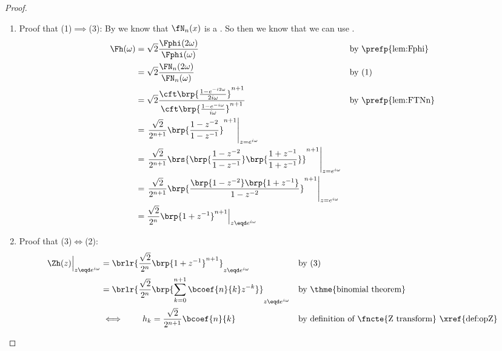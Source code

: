 \begin{proof}
\begin{enumerate}
  \item Proof that (1)$\implies$(3):
        By  we know that $\fN_n(x)$ is a  .
        So then we know that we can use .
        \begin{align*}
          \Fh(\omega)
            &= \sqrt{2}\frac{\Fphi(2\omega)}{\Fphi(\omega)}
            && \text{by \prefp{lem:Fphi}}
          \\&= \sqrt{2}\frac{\FN_n(2\omega)}{\FN_n(\omega)}
            && \text{by (1)}
          \\&= \sqrt{2}\frac{{\cft}\brp{\frac{1-e^{-i2\omega}}{2i\omega}}^{n+1}}
                            {{\cft}\brp{\frac{1-e^{-i\omega}}{i\omega}}^{n+1}}
            && \text{by \prefp{lem:FTNn}}
          \\&= \left.\frac{\sqrt{2}}{2^{n+1}} 
               \brp{\frac{1-z^{-2}}{1-z^{-1}}}^{n+1}\right|_{z=e^{i\omega}}
          \\&= \left.\frac{\sqrt{2}}{2^{n+1}} 
               \brs{\brp{\frac{1-z^{-2}}{1-z^{-1}}}
               \brp{\frac{1+z^{-1}}{1+z^{-1}}}}^{n+1}\right|_{z=e^{i\omega}}
          \\&= \left.\frac{\sqrt{2}}{2^{n+1}} 
               \brp{\frac{ \brp{1-z^{-2}}  \brp{1+z^{-1}}}{1-z^{-2}}}^{n+1}\right|_{z=e^{i\omega}}
          \\&= \frac{\sqrt{2}}{2^n}\brp{1+z^{-1}}^{n+1}\Big|_{z\eqd e^{i\omega}}
        \end{align*}

  \item Proof that (3)$\iff$(2):\\
    \begin{align*}
      \Zh(z)\Big|_{z\eqd e^{i\omega}}
            &= \brlr{\frac{\sqrt{2}}{2^n}\brp{1+z^{-1}}^{n+1}}_{z\eqd e^{i\omega}}
            && \text{by (3)}
          \\&= \brlr{\frac{\sqrt{2}}{2^n}\brp{\sum_{k=0}^{n+1} \bcoef{n}{k} z^{-k}}}_{z\eqd e^{i\omega}}
            && \text{by \thme{binomial theorem}}
          \\&\iff \qquad h_k = \frac{\sqrt{2}}{2^{n+1}} \bcoef{n}{k}
            && \text{by definition of \fncte{Z transform} \xref{def:opZ}}
    \end{align*}


\end{enumerate}
\end{proof}
